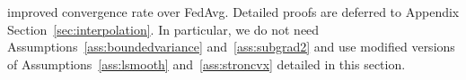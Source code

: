improved convergence rate over FedAvg. Detailed proofs are deferred to Appendix Section~\ref{sec:interpolation}. In particular, we do not need Assumptions~\ref{ass:boundedvariance} and~\ref{ass:subgrad2} and use modified versions of Assumptions~\ref{ass:lsmooth} and~\ref{ass:stroncvx} detailed in this section.
\begin{comment}
we deal with the question of whether FedAvg with momentum-based
local updates can outperform FedAvg with SGD updates. In contrast
to the gradient descent setting, Nesterov and Heavy Ball updates are
known to fail to accelerate over SGD, both in the overparameterized
setting and standard convex setting \cite{liu2018accelerating,kidambi2018insufficiency,liu2018toward,yuan2016influence}.
Thus in general one cannot hope to obtain acceleration results for
the FedAvg algorithm with Nesterov and Heavy Ball updates. On the
hopeful side, \cite{jain2017accelerating,liu2018accelerating} introduced
similar algorithms that make modifications of the Nesterov updates
to correct for its ``over-descent''. For quadratic objectives in
the overparamterized setting, \cite{liu2018accelerating} show their
algorithm achieves acceleration over the geometric convergence of
SGD that recovers the well-known $\mathcal{O}(\exp(-t/\sqrt{\kappa})$
acceleration of Nesterov over GD. In the last part, we introduce a
new accelerated FedAvg algorithm by adapting the MaSS algorithm of
\cite{liu2018accelerating} to the FL setting. We
show that it achieves geometric convergence for overparameterized
linear regression with an $\mathcal{O}(\exp(-\frac{NT}{E\sqrt{\kappa_{1}\tilde{\kappa}}}))$ rate,
where $\tilde{\kappa}$ is a ``statistical condition number''\cite{liu2018accelerating,jain2017accelerating}
that satisfies $\tilde{\kappa}\leq\kappa_{1}$. Thus our new FedAvg
algorithm achieves a speedup of factor $\sqrt{\kappa_{1}/\tilde{\kappa}}$
over FedAvg with local SGD updates. 
\end{comment}


